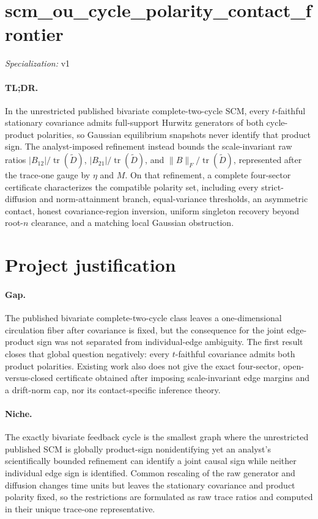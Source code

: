 \documentclass{article}
\begin{document}
\sloppy

\section*{scm\_\allowbreak{}ou\_\allowbreak{}cycle\_\allowbreak{}polarity\_\allowbreak{}contact\_\allowbreak{}frontier}

\noindent\textit{Specialization:} v1\par

\paragraph{TL;DR.} In the unrestricted published bivariate complete-two-cycle SCM, every \(t\)-faithful stationary covariance admits full-support Hurwitz generators of both cycle-product polarities, so Gaussian equilibrium snapshots never identify that product sign. The analyst-imposed refinement instead bounds the scale-invariant raw ratios \(|B_{12}|/\operatorname{tr}(\widetilde D)\), \(|B_{21}|/\operatorname{tr}(\widetilde D)\), and \(\lVert B\rVert_F/\operatorname{tr}(\widetilde D)\), represented after the trace-one gauge by \(\eta\) and \(M\). On that refinement, a complete four-sector certificate characterizes the compatible polarity set, including every strict-diffusion and norm-attainment branch, equal-variance thresholds, an asymmetric contact, honest covariance-region inversion, uniform singleton recovery beyond root-\(n\) clearance, and a matching local Gaussian obstruction.

\section{Project justification}

\paragraph{Gap.} The published bivariate complete-two-cycle class leaves a one-dimensional circulation fiber after covariance is fixed, but the consequence for the joint edge-product sign was not separated from individual-edge ambiguity. The first result closes that global question negatively: every \(t\)-faithful covariance admits both product polarities. Existing work also does not give the exact four-sector, open-versus-closed certificate obtained after imposing scale-invariant edge margins and a drift-norm cap, nor its contact-specific inference theory.

\paragraph{Niche.} The exactly bivariate feedback cycle is the smallest graph where the unrestricted published SCM is globally product-sign nonidentifying yet an analyst's scientifically bounded refinement can identify a joint causal sign while neither individual edge sign is identified. Common rescaling of the raw generator and diffusion changes time units but leaves the stationary covariance and product polarity fixed, so the restrictions are formulated as raw trace ratios and computed in their unique trace-one representative.
\end{document}
